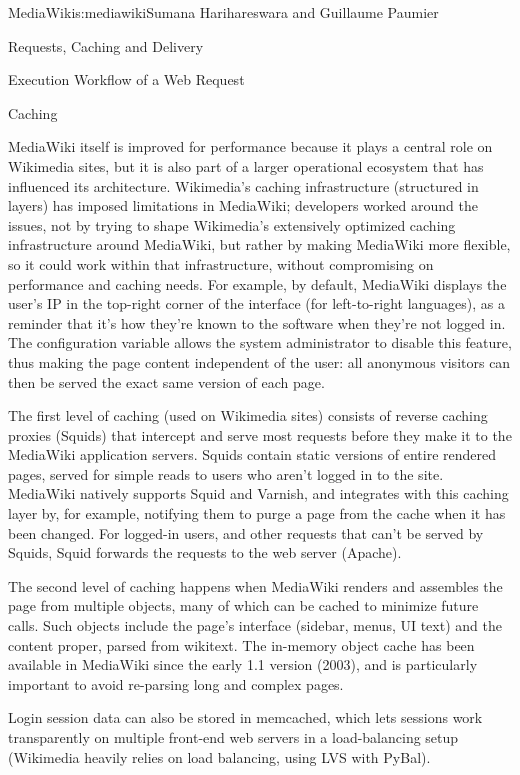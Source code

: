 \begin{aosachapter}{MediaWiki}{s:mediawiki}{Sumana Harihareswara and Guillaume Paumier}
\begin{aosasect1}{Requests, Caching and Delivery}
\begin{aosasect2}{Execution Workflow of a Web Request}
\end{aosasect2}

\begin{aosasect2}{Caching}

MediaWiki itself is improved for performance because it plays a
central role on Wikimedia sites, but it is also part of a larger
operational ecosystem that has influenced its
architecture. Wikimedia's caching infrastructure (structured in
layers) has imposed limitations in MediaWiki; developers worked around
the issues, not by trying to shape Wikimedia's extensively optimized
caching infrastructure around MediaWiki, but rather by making
MediaWiki more flexible, so it could work within that infrastructure,
without compromising on performance and caching needs. For example, by
default, MediaWiki displays the user's IP in the top-right corner of
the interface (for left-to-right languages), as a reminder that it's
how they're known to the software when they're not logged in. The
 configuration variable allows the system
administrator to disable this feature, thus making the page content
independent of the user: all anonymous visitors can then be served the
exact same version of each page.

The first level of caching (used on Wikimedia sites) consists of
reverse caching proxies (Squids) that intercept and serve most
requests before they make it to the MediaWiki application
servers. Squids contain static versions of entire rendered pages,
served for simple reads to users who aren't logged in to the
site. MediaWiki natively supports Squid and Varnish, and integrates
with this caching layer by, for example, notifying them to purge a
page from the cache when it has been changed. For logged-in users, and
other requests that can't be served by Squids, Squid forwards the
requests to the web server (Apache).

The second level of caching happens when MediaWiki renders and
assembles the page from multiple objects, many of which can be cached
to minimize future calls. Such objects include the page's interface
(sidebar, menus, UI text) and the content proper, parsed from
wikitext. The in-memory object cache has been available in MediaWiki
since the early 1.1 version (2003), and is particularly important to
avoid re-parsing long and complex pages.

Login session data can also be stored in memcached, which lets
sessions work transparently on multiple front-end web servers in a
load-balancing setup (Wikimedia heavily relies on load balancing,
using LVS with PyBal).


\end{aosasect2}
\end{aosasect1}
\end{aosachapter}
